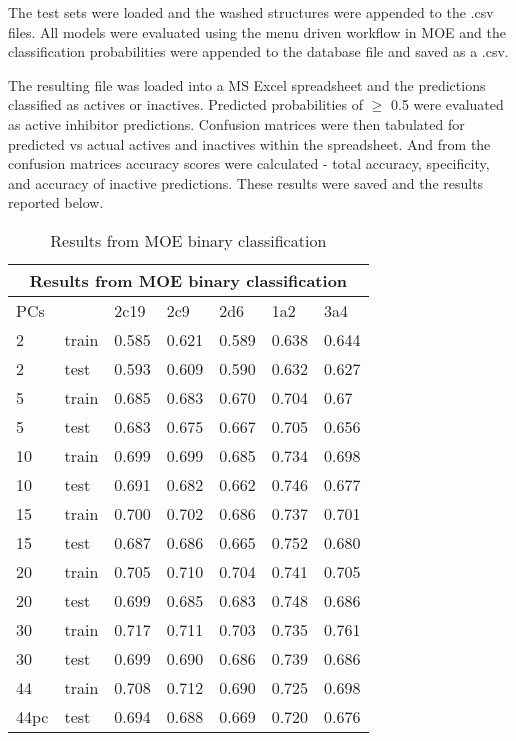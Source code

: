 The test sets were loaded and the washed structures were appended to the .csv files. All models were evaluated using the menu driven workflow in MOE and the classification probabilities were appended to the database file and saved as a .csv.  

The resulting file was loaded into a MS Excel spreadsheet and the predictions classified as actives or inactives. Predicted probabilities of $\geq$ 0.5 were evaluated as active inhibitor predictions. Confusion matrices were then tabulated for predicted vs actual actives and inactives within the spreadsheet. And from the confusion matrices accuracy scores were calculated - total accuracy, specificity, and accuracy of inactive predictions. These results were saved and the results reported below.

\begin{table}[!htbp]
\begin{tabular}{|l|l|l|l|l|l|l|}
\hline
\multicolumn{7}{|c|}{Results from MOE binary classification}                        \\ \hline
PCs  &       & 2c19  & 2c9   & 2d6   & 1a2   & 3a4   \\ \hline
2    & train & 0.585 & 0.621 & 0.589 & 0.638 & 0.644 \\ \hline
2    & test  & 0.593 & 0.609 & 0.590 & 0.632 & 0.627 \\ \hline
5    & train & 0.685 & 0.683 & 0.670 & 0.704 & 0.67  \\ \hline
5    & test  & 0.683 & 0.675 & 0.667 & 0.705 & 0.656 \\ \hline
10   & train & 0.699 & 0.699 & 0.685 & 0.734 & 0.698 \\ \hline
10   & test  & 0.691 & 0.682 & 0.662 & 0.746 & 0.677 \\ \hline
15   & train & 0.700 & 0.702 & 0.686 & 0.737 & 0.701 \\ \hline
15   & test  & 0.687 & 0.686 & 0.665 & 0.752 & 0.680 \\ \hline
20   & train & 0.705 & 0.710 & 0.704 & 0.741 & 0.705 \\ \hline
20   & test  & 0.699 & 0.685 & 0.683 & 0.748 & 0.686 \\ \hline
30   & train & 0.717 & 0.711 & 0.703 & 0.735 & 0.761 \\ \hline
30   & test  & 0.699 & 0.690 & 0.686 & 0.739 & 0.686 \\ \hline
44   & train & 0.708 & 0.712 & 0.690 & 0.725 & 0.698 \\ \hline
44pc & test  & 0.694 & 0.688 & 0.669 & 0.720 & 0.676 \\ \hline
\end{tabular}
\caption{Results from MOE binary classification}
\end{table}

